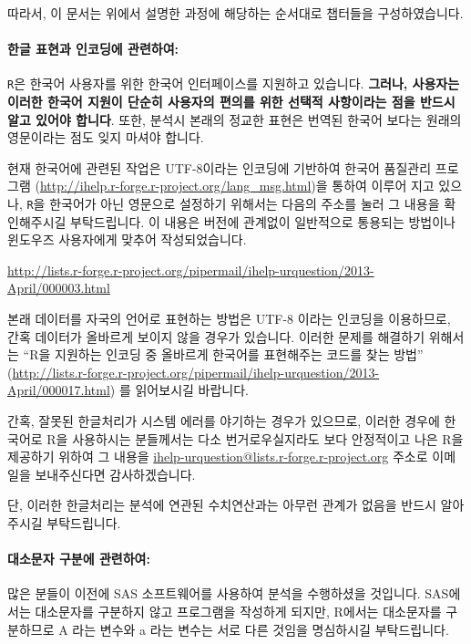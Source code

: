 \documentclass{report}
\begin{document}
따라서, 이 문서는 위에서 설명한 과정에 해당하는 순서대로 챕터들을 구성하였습니다. 

\paragraph{한글 표현과 인코딩에 관련하여:}

\texttt{R}은 한국어 사용자를 위한 한국어 인터페이스를 지원하고 있습니다. 
\textbf{그러나, 사용자는 이러한 한국어 지원이 단순히 사용자의 편의를 위한 선택적 사항이라는 점을 반드시 알고 있어야 합니다}.
또한, 분석시 본래의 정교한 표현은 번역된 한국어 보다는 원래의 영문이라는 점도 잊지 마셔야 합니다. 

현재 한국어에 관련된 작업은 UTF-8이라는 인코딩에 기반하여 한국어 품질관리 프로그램 (\url{http://ihelp.r-forge.r-project.org/lang_msg.html})을 통하여 이루어 지고 있으나, \texttt{R}을 한국어가 아닌 영문으로 설정하기 위해서는 다음의 주소를 눌러 그 내용을 확인해주시길 부탁드립니다. 
이 내용은 버전에 관계없이 일반적으로 통용되는 방법이나 윈도우즈 사용자에게 맞추어 작성되었습니다. 

\url{http://lists.r-forge.r-project.org/pipermail/ihelp-urquestion/2013-April/000003.html}

본래 데이터를 자국의 언어로 표현하는 방법은 UTF-8 이라는 인코딩을 이용하므로, 간혹 데이터가 올바르게 보이지 않을 경우가 있습니다. 
이러한 문제를 해결하기 위해서는 ``R을 지원하는 인코딩 중 올바르게 한국어를 표현해주는 코드를 찾는 방법'' (\url{http://lists.r-forge.r-project.org/pipermail/ihelp-urquestion/2013-April/000017.html}) 를 읽어보시길 바랍니다.

간혹, 잘못된 한글처리가 시스템 에러를 야기하는 경우가 있으므로, 이러한 경우에 한국어로 R을 사용하시는 분들께서는 다소 번거로우실지라도 보다 안정적이고 나은 R을 제공하기 위하여 그 내용을 \href{mailto:ihelp-urquestion@lists.r-forge.r-project.org}{ihelp-urquestion@lists.r-forge.r-project.org} 주소로 이메일을 보내주신다면 감사하겠습니다. 

단, 이러한 한글처리는 분석에 연관된 수치연산과는 아무런 관계가 없음을 반드시 알아주시길 부탁드립니다.


\paragraph{대소문자 구분에 관련하여:}
많은 분들이 이전에 SAS 소프트웨어를 사용하여 분석을 수행하셨을 것입니다.
SAS에서는 대소문자를 구분하지 않고 프로그램을 작성하게 되지만, R에서는 대소문자를 구분하므로 A 라는 변수와 a 라는 변수는 서로 다른 것임을 명심하시길 부탁드립니다. 
\end{document}
